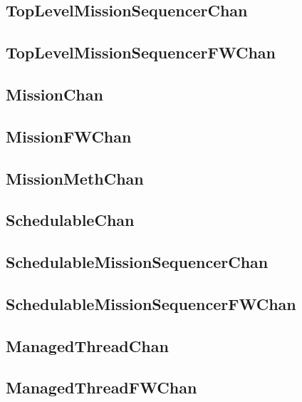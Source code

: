 \documentclass{article}
\begin{document}
\subsection{TopLevelMissionSequencerChan}


\subsection{TopLevelMissionSequencerFWChan}


\subsection{MissionChan}


\subsection{MissionFWChan}


\subsection{MissionMethChan}


\subsection{SchedulableChan}


\subsection{SchedulableMissionSequencerChan}


\subsection{SchedulableMissionSequencerFWChan}


\subsection{ManagedThreadChan}


\subsection{ManagedThreadFWChan}

\end{document}
